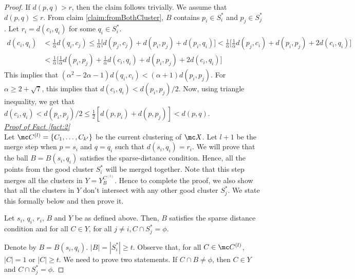 \documentclass[11pt]{article}
\begin{document}
\begin{proof}
\vspace{-0.1in} If $d(p, q) > r$, then the claim follows trivially. We assume that $d(p, q) \le r$. From claim \ref{claim:fromBothCluster}, $B$ contains $p_i \in S_i^*$ and $p_j \in S_j^*$. Let $r_i = d(c_i, q_i)$ for some $q_i \in S_i^*$.
\begin{align*}
d(c_i, q_i) &< \frac{1}{\alpha} d(q_i, c_j) \le \frac{1}{\alpha} \bigg[ d(p_j, c_j) + d(p_i, p_j) + d(p_i, q_i)\bigg] < \frac{1}{\alpha} \bigg[ \frac{1}{\alpha}d(p_j, c_i) + d(p_i, p_j) + 2d(c_i, q_i)\bigg]\\
& < \frac{1}{\alpha} \bigg[ \frac{1}{\alpha}d(p_i, p_j) + \frac{1}{\alpha}d(c_i, q_i) + d(p_i, p_j) + 2d(c_i, q_i)\bigg]
\end{align*}
This implies that $(\alpha^2 - 2\alpha - 1)d(q_i, c_i) < (\alpha + 1) d(p_i, p_j)$. For $\alpha \ge 2 + \sqrt 7$, this implies that $d(c_i, q_i) < d(p_i, p_j)/2$. Now, using triangle inequality, we get that $d(c_i, q_i) < d(p_i, p_j)/2 \le \frac{1}{2}[d(p, p_i) + d(p, p_j)] < d(p, q)$.\\

\noindent\textit{\underline{Proof of Fact \ref{fact:2}%
}}\\
Let $\mc C^{(l)} = \{C_1, \ldots, C_{k'}\}$ be the current clustering of $\mc X$. Let $l+1$ be the merge step when $p = s_i$ and $q = q_i$ such that $d(s_i, q_i) = r_i$. We will prove that the ball $B = B(s_i, q_i)$ satisfies the sparse-distance condition. Hence, all the points from the good cluster $S_i^*$ will be merged together. Note that this step merges all the clusters in $Y = Y_B^{C^{(l)}}$. Hence to complete the proof, we also show that all the clusters in $Y$ don't intersect with any other good cluster $S_j^*$. We state this formally below and then prove it.

\begin{claim}
\label{claim:dciqi}
Let $s_i$, $q_i$, $r_i$, $B$ and $Y$ be as defined above. Then, $B$ satisfies the sparse distance condition and for all $C \in Y$, for all $j \neq i, C \cap S_j^* = \phi$.
\end{claim}

\vspace{-0.1in} Denote by $B = B(s_i, q_i)$. $|B| = |S_i^*| \ge t$. Observe that, for all $C \in \mc C^{(l)}$, $|C| = 1$ or $|C| \ge t$. We need to prove two statements. If $C \cap B \neq \phi$, then $C \in Y$ and $C \cap S_j^* = \phi$. 


\end{proof}
\end{document}
